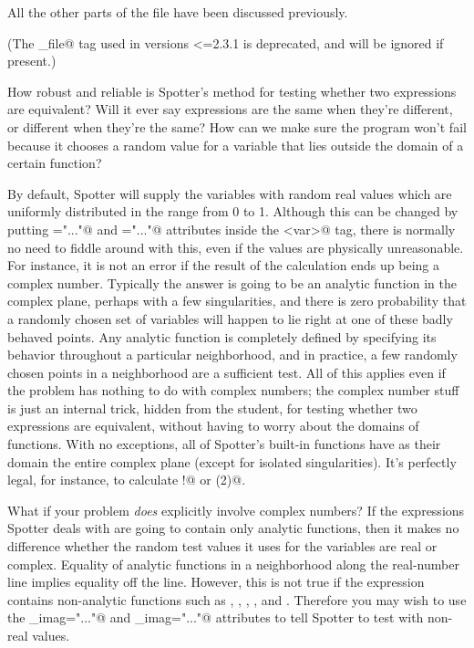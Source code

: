 \documentclass{doc}
\begin{document}
  All the other parts of the file have been discussed previously.
  
(The \verb@log_file@ tag used in versions <=2.3.1 is deprecated, and will be ignored if present.)
 
How robust and reliable is Spotter's method for testing whether two expressions are equivalent?
Will it ever say expressions are the same when they're different, or different when they're
the same? How can we make sure the program won't fail because it chooses a random
value for a variable that lies outside the domain of a certain function?

By default, Spotter will
 supply the variables with random real values which are uniformly distributed
in the range from 0 to 1. Although this can be changed by putting
\verb@min="..."@ and \verb@max="..."@ attributes inside the \verb@<var>@ tag,
 there is normally no need to fiddle around with this, even if
the values are physically unreasonable. For instance, it is not an error if the
result of the calculation ends up being a complex number. Typically the answer
is going to be an analytic function in the complex plane, perhaps with a few singularities,
 and there is zero probability that a randomly chosen set of variables will
happen to lie right at one of these badly behaved points. Any analytic function
is completely defined by specifying its behavior throughout a particular neighborhood, and in practice,
a few randomly chosen points in a neighborhood are a sufficient test. All of this applies even if
the problem has nothing to do with complex numbers; the complex number stuff is
just an internal trick, hidden from the student, for testing whether two expressions
are equivalent, without having to worry about the domains of functions. With no
exceptions, all of Spotter's built-in functions have as their domain the entire
complex plane (except for isolated singularities). It's perfectly legal, for instance,
to calculate !@ or \verb@acos(2)@.

What if your problem \emph{does} explicitly involve complex numbers? If the expressions
Spotter deals with are going to contain only analytic functions, then it makes no difference
whether the random test values it uses for the variables are real or complex. Equality
of analytic functions in a neighborhood along the real-number line implies equality off the line.
However, this is not true if the expression contains non-analytic functions such as
\verb@abs@, \verb@Re@, \verb@Im@, \verb@arg@, and \verb@conj@. Therefore
 you may wish to
use the \verb@min_imag="..."@ and \verb@max_imag="..."@ attributes to tell Spotter
to test with non-real values.
\end{document}
